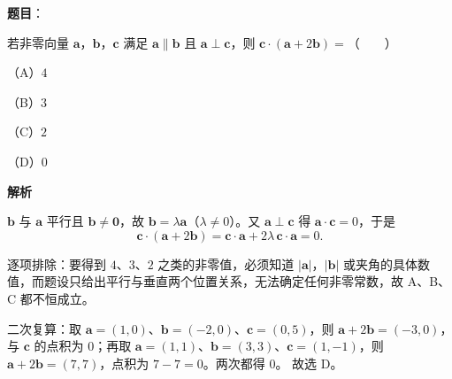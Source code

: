 \begin{answer}

\textbf{题目}：

若非零向量 $\boldsymbol a$，$\boldsymbol b$，$\boldsymbol c$ 满足 $\boldsymbol a\parallel\boldsymbol b$ 且 $\boldsymbol a\perp\boldsymbol c$，则 $\boldsymbol c\cdot(\boldsymbol a+2\boldsymbol b)=$\mbox{（　　）}

（A）$4$

（B）$3$

（C）$2$

（D）$0$

\textbf{解析}

$\boldsymbol b$ 与 $\boldsymbol a$ 平行且 $\boldsymbol b\ne\boldsymbol 0$，故 $\boldsymbol b=\lambda\boldsymbol a$（$\lambda\ne0$）。又 $\boldsymbol a\perp\boldsymbol c$ 得 $\boldsymbol a\cdot\boldsymbol c=0$，于是
\nopagebreak[4]
\[\boldsymbol c\cdot(\boldsymbol a+2\boldsymbol b)=\boldsymbol c\cdot\boldsymbol a+2\lambda\,\boldsymbol c\cdot\boldsymbol a=0.\]

逐项排除：要得到 $4$、$3$、$2$ 之类的非零值，必须知道 $|\boldsymbol a|$，$|\boldsymbol b|$ 或夹角的具体数值，而题设只给出平行与垂直两个位置关系，无法确定任何非零常数，故 A、B、C 都不恒成立。

二次复算：取 $\boldsymbol a=(1,0)$、$\boldsymbol b=(-2,0)$、$\boldsymbol c=(0,5)$，则 $\boldsymbol a+2\boldsymbol b=(-3,0)$，与 $\boldsymbol c$ 的点积为 $0$；再取 $\boldsymbol a=(1,1)$、$\boldsymbol b=(3,3)$、$\boldsymbol c=(1,-1)$，则 $\boldsymbol a+2\boldsymbol b=(7,7)$，点积为 $7-7=0$。两次都得 $0$。
故选 D。


\end{answer}
